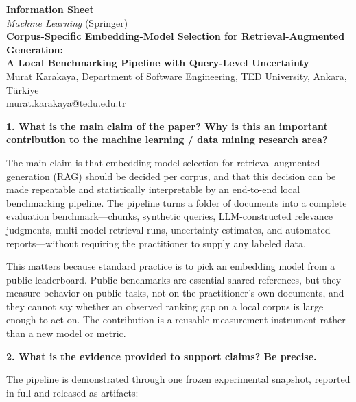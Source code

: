 \documentclass[10pt,a4paper]{article}
\newcommand{\q}[1]{\medskip\noindent\textbf{#1}\par\nopagebreak}
\begin{document}
\begin{center}
{\large\bfseries Information Sheet}\\[2pt]
{\itshape Machine Learning} (Springer)\\[6pt]
\textbf{Corpus-Specific Embedding-Model Selection for Retrieval-Augmented Generation:\\
A Local Benchmarking Pipeline with Query-Level Uncertainty}\\[2pt]
Murat Karakaya, Department of Software Engineering, TED University, Ankara, T\"urkiye\\
\href{mailto:murat.karakaya@tedu.edu.tr}{murat.karakaya@tedu.edu.tr}
\end{center}

\q{1. What is the main claim of the paper? Why is this an important contribution to the
machine learning / data mining research area?}

The main claim is that embedding-model selection for retrieval-augmented generation (RAG)
should be decided per corpus, and that this decision can be made repeatable and statistically
interpretable by an end-to-end local benchmarking pipeline. The pipeline turns a folder of
documents into a complete evaluation benchmark---chunks, synthetic queries, LLM-constructed
relevance judgments, multi-model retrieval runs, uncertainty estimates, and automated
reports---without requiring the practitioner to supply any labeled data.

This matters because standard practice is to pick an embedding model from a public leaderboard.
Public benchmarks are essential shared references, but they measure behavior on public tasks,
not on the practitioner's own documents, and they cannot say whether an observed ranking gap on
a local corpus is large enough to act on. The contribution is a reusable measurement instrument
rather than a new model or metric.

\q{2. What is the evidence provided to support claims? Be precise.}

The pipeline is demonstrated through one frozen experimental snapshot, reported in full and
released as artifacts:
\end{document}

